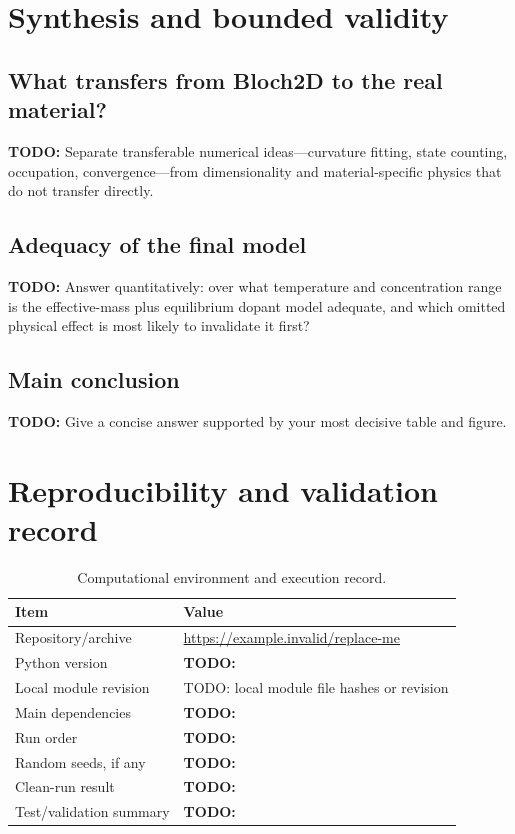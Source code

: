 \documentclass[11pt,a4paper]{article}
\newcommand{\repositoryurl}{https://example.invalid/replace-me}
\newcommand{\localmoduleversion}{TODO: local module file hashes or revision}
\newcommand{\todo}[1]{\textcolor{BrickRed}{\textbf{TODO:} #1}}
\begin{document}
\section{Synthesis and bounded validity}
\label{sec:synthesis}

\subsection{What transfers from Bloch2D to the real material?}

\todo{Separate transferable numerical ideas---curvature fitting, state counting,
occupation, convergence---from dimensionality and material-specific physics
that do not transfer directly.}

\subsection{Adequacy of the final model}

\todo{Answer quantitatively: over what temperature and concentration range is
the effective-mass plus equilibrium dopant model adequate, and which omitted
physical effect is most likely to invalidate it first?}

\subsection{Main conclusion}

\todo{Give a concise answer supported by your most decisive table and figure.}

\section{Reproducibility and validation record}
\label{sec:reproducibility}

\begin{table}[htbp]
  \centering
  \caption{Computational environment and execution record.}
  \label{tab:environment}
  \begin{tabularx}{\textwidth}{@{}p{}X@{}}
    \toprule
    Item & Value \\
    \midrule
    Repository/archive & \url{\repositoryurl} \\
    Python version & \todo{ } \\
    Local module revision & \localmoduleversion \\
    Main dependencies & \todo{ } \\
    Run order & \todo{ } \\
    Random seeds, if any & \todo{ } \\
    Clean-run result & \todo{ } \\
    Test/validation summary & \todo{ } \\
    \bottomrule
  \end{tabularx}
\end{table}
\end{document}
